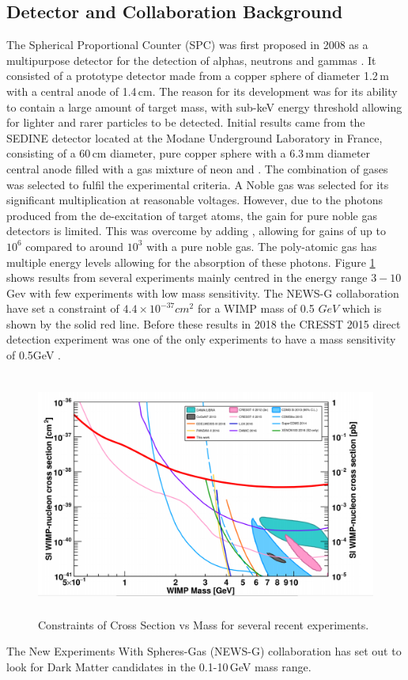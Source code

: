 \documentclass[a4paper]{article}
\begin{document}
\subsection{Detector and Collaboration Background}
The Spherical Proportional Counter (SPC) was first proposed in 2008 as a multipurpose detector for the detection of alphas, neutrons and gammas \cite{Giomataris_2008}. It consisted of a prototype detector made from a copper sphere of diameter 1.2\,m with a central anode of 1.4\,cm. The reason for its development was for its ability to contain a large amount of target mass, with sub-keV energy threshold allowing for lighter and rarer particles to be detected. 
\newline Initial results came from the SEDINE detector located at the Modane Underground Laboratory in France, consisting of a 60\,cm diameter, pure copper sphere with a 6.3\,mm diameter central anode filled with a gas mixture of neon and \cite{Arnaud_2018}. The combination of gases was selected to fulfil the experimental criteria. A Noble gas was selected for its significant multiplication at reasonable voltages. However, due to the photons produced from the de-excitation of target atoms, the gain for pure noble gas detectors is limited. This was overcome by adding , allowing for gains of up to $10^6$ compared to around $10^3$ with a pure noble gas\cite{fernow_1986}. The poly-atomic gas has multiple energy levels allowing for the absorption of these photons. Figure \ref{fig:Dark} shows results from several experiments mainly centred in the energy range $3-10$\,Gev with few experiments with low mass sensitivity. The NEWS-G collaboration have set a constraint of $4.4 \times 10^{-37} cm^2$ for a WIMP mass of 0.5 $GeV$ which is shown by the solid red line. Before these results in 2018 the CRESST 2015 direct detection experiment was one of the only experiments to have a mass sensitivity of 0.5GeV \cite{Angloher_2016}.
\begin{figure}[H]
    \centering
    \includegraphics[height=8cm]{plots/Dark.png}
    \caption{Constraints of Cross Section vs Mass for several recent experiments\cite{Arnaud_2018}.}
    \label{fig:Dark}
\end{figure}
\noindent The New Experiments With Spheres-Gas (NEWS-G) collaboration has set out to look for Dark Matter candidates in the 0.1-10\,GeV mass range.
\end{document}
